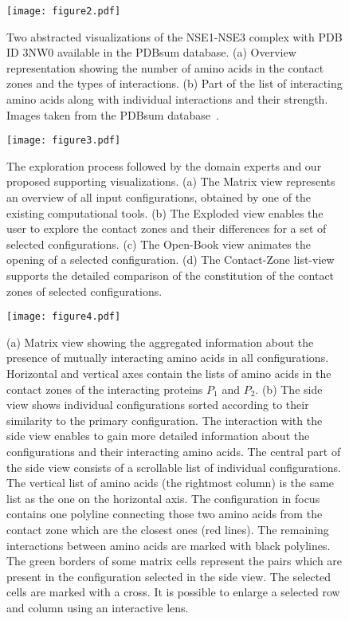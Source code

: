 \documentclass{bmcart}
\def\OpBook {Open-Book view\xspace}
\def\ExpView {Exploded view\xspace}
\def\MatView {Matrix view\xspace}
\def\CoZoListView {Contact-Zone list-view\xspace}
\begin{document}
\begin{backmatter}
\begin{figure}[h!]
  \centering	
  \texttt{[image: figure2.pdf]}
  \caption{
    Two abstracted visualizations of the NSE1-NSE3 complex with PDB ID 3NW0 available in the PDBsum database. (a) Overview representation showing the number of amino acids in the contact zones and the types of interactions. (b) Part of the list of interacting amino acids along with individual interactions and their strength. Images taken from the PDBsum database~\cite{pdbsum}.}
    \label{fig:pdbsum}
\end{figure}

\begin{figure}[h!]
  \centering	
  \texttt{[image: figure3.pdf]}
  \caption{
  The exploration process followed by the domain experts and our proposed supporting visualizations. (a) The \MatView represents an overview of all input configurations, obtained by one of the existing computational tools. (b) The \ExpView enables the user to explore the contact zones and their differences for a set of selected configurations. (c) The \OpBook animates the opening of a selected configuration. (d) The \CoZoListView supports the detailed comparison of the constitution of the contact zones of selected configurations.}
  \label{fig:workflow}
\end{figure}

\begin{figure}[h!]
  \centering
  \texttt{[image: figure4.pdf]}
  \caption{
  (a) \MatView showing the aggregated information about the presence of mutually interacting amino acids in all configurations. Horizontal and vertical axes contain the lists of amino acids in the contact zones of the interacting proteins $P_1$ and $P_2$. (b) The side view shows individual configurations sorted according to their similarity to the primary configuration. The interaction with the side view enables to gain more detailed information about the configurations and their interacting amino acids. The central part of the side view consists of a scrollable list of individual configurations. The vertical list of amino acids (the rightmost column) is the same list as the one on the horizontal axis. The configuration in focus contains one polyline connecting those two amino acids from the contact zone which are the closest ones (red lines). The remaining interactions between amino acids are marked with black polylines. The green borders of some matrix cells represent the pairs which are present in the configuration selected in the side view. The selected cells are marked with a cross. It is possible to enlarge a selected row and column using an interactive lens.}
  \label{fig:matrixlens}
\end{figure}


\end{backmatter}
\end{document}
